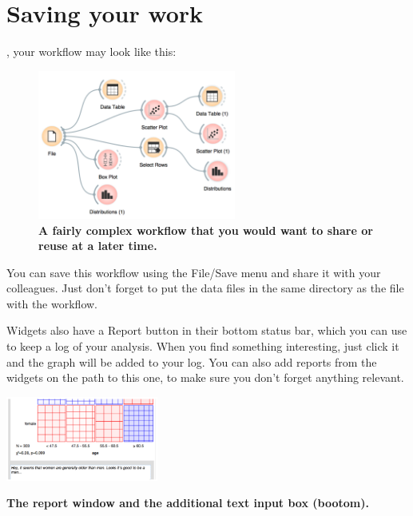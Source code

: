 \chapter{Saving your work}
\label{ch:saving_your_work}

, your workflow may look like this:
\begin{figure}[h]
  \centering
  \includegraphics[width=65mm]{saving-fig1.png}%
  \caption{\textbf{\textsf{A fairly complex workflow that you would want to share or reuse at a later time.}}}
  \label{fig:saveing-fig1}
\end{figure}

You can save this workflow using the File/Save menu and share it with your colleagues. Just don't forget to put the data files in the same directory as the file with the workflow.

Widgets also have a Report button in their bottom status bar, which you can use to keep a log of your analysis. When you find something interesting, just click it and the graph will be added to your log. You can also add reports from the widgets on the path to this one, to make sure you don't forget anything relevant.

\begin{marginfigure}
  \includegraphics[width=50mm]{saving-fig3.png}%
  \caption{\textbf{\textsf{The report window and the additional text input box (bootom).}}}
  \label{fig:saveing-fig3}
\end{marginfigure}


